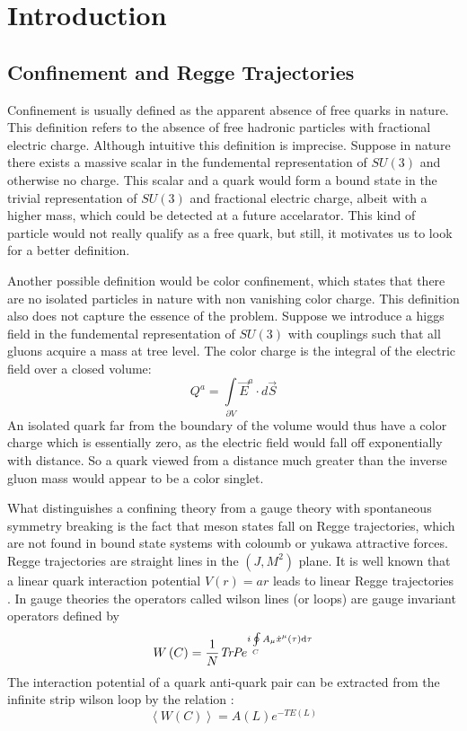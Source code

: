 \documentclass[11pt,a4paper]{article}
\begin{document}
\tableofcontents

\section{Introduction}
\FloatBarrier
\subsection{Confinement and Regge Trajectories}

Confinement\cite{Greensite08} is usually defined as the apparent absence of free quarks in nature. This definition refers to the absence of free hadronic particles with fractional electric charge. Although intuitive this definition is imprecise. Suppose in nature there exists a massive scalar in the fundemental representation of $SU\left(3\right)$ and otherwise no charge. This scalar and a quark would form a bound state in the trivial representation of $SU\left(3\right)$ and fractional electric charge, albeit with a higher mass, which could be detected at a future accelarator. This kind of particle would not really qualify as a free quark, but still, it motivates us to look for a better definition.

Another possible definition would be color confinement, which states that there are no isolated particles in nature with non vanishing color charge. This definition also does not capture the essence of the problem. Suppose we introduce a higgs field in the fundemental representation of $SU\left(3\right)$ with couplings such that all gluons acquire a mass at tree level. The color charge is the integral of the electric field over a closed volume:
\begin{equation}
Q^a=\int\limits_{\partial V} \vec{E}^a \cdot d\vec{S}
\end{equation}
An isolated quark far from the boundary of the volume would thus have a color charge which is essentially zero, as the electric field would fall off exponentially with distance. So a quark viewed from a distance much greater than the inverse gluon mass would appear to be a color singlet.

What distinguishes a confining theory from a gauge theory with spontaneous symmetry breaking is the fact that meson states fall on Regge trajectories, which are not found in bound state systems with coloumb or yukawa attractive forces. Regge trajectories are straight lines in the $\left(J,M^2\right)$ plane. It is well known that a linear quark interaction potential $V(r)=a r$ leads to linear Regge trajectories \cite{LUCHA89}. In gauge theories the operators called wilson lines (or loops) are gauge invariant operators defined by
\begin{equation}
W\left(C\right)=\frac{1}{N}\emph{TrP} e^{i\oint\limits_CA_\mu \dot{x}^\mu\left(\tau\right)\mathrm{d}\tau }
\end{equation}
The interaction potential of a quark anti-quark pair can be extracted from the infinite strip wilson loop by the relation \cite{Sonnenschein00}:
\begin{equation}
\left\langle W\left(C\right)\right\rangle=A\left(L\right)e^{-TE\left(L\right)}
\end{equation}
\end{document}
